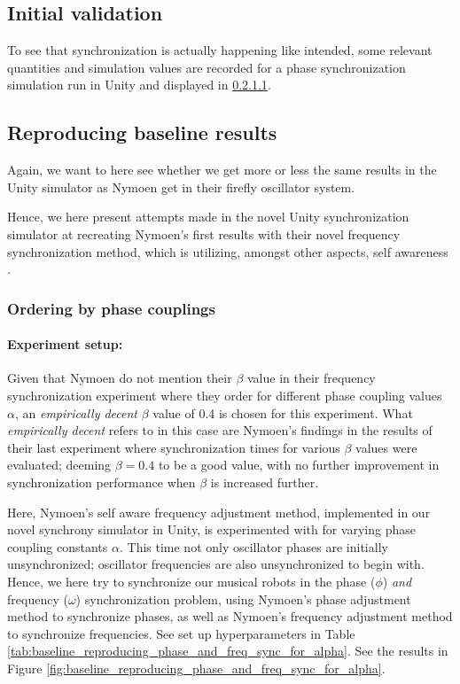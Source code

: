 	\subsection{Initial validation}
	
	To see that synchronization is actually happening like intended, some relevant quantities and simulation values are recorded for a phase synchronization simulation run in Unity and displayed in \ref{}.
	
	

	\subsection{Reproducing baseline results}
	Again, we want to here see whether we get more or less the same results in the Unity simulator as Nymoen get in their firefly oscillator system.
	
	Hence, we here present attempts made in the novel Unity synchronization simulator at recreating Nymoen's first results with their novel frequency synchronization method, which is utilizing, amongst other aspects, self awareness \cite{nymoen_synch}.
	
		\subsubsection{Ordering by phase couplings}
		\label{exp:phase_and_freq_baseline_reproducing_initial_phase_ordering}
		
			\paragraph{Experiment setup:\nl}
			
			Given that Nymoen do not mention their $\beta$ value in their frequency synchronization experiment where they order for different phase coupling values $\alpha$, an \textit{empirically decent} $\beta$ value of 0.4 is chosen for this experiment. What \textit{empirically decent} refers to in this case are Nymoen's findings in the results of their last experiment \cite{nymoen_synch} where synchronization times for various $\beta$ values were evaluated; deeming $\beta=0.4$ to be a good value, with no further improvement in synchronization performance when $\beta$ is increased further.
			
			Here, Nymoen's self aware frequency adjustment method, implemented in our novel synchrony simulator in Unity, is experimented with for varying phase coupling constants $\alpha$. This time not only oscillator phases are initially unsynchronized; oscillator frequencies are also unsynchronized to begin with. Hence, we here try to synchronize our musical robots in the phase ($\phi$) \textit{and} frequency ($\omega$) synchronization problem, using Nymoen's phase adjustment method to synchronize phases, as well as Nymoen's frequency adjustment method to synchronize frequencies. See set up hyperparameters in Table \ref{tab:baseline_reproducing_phase_and_freq_sync_for_alpha}. See the results in Figure \ref{fig:baseline_reproducing_phase_and_freq_sync_for_alpha}.
			
